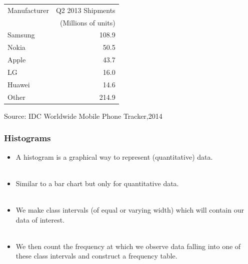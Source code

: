 \documentclass[xcolor=svgnames, compress]{beamer}
\begin{document}
\begin{frame}[t]
\tiny

\vspace{-5.50cm}
\begin{center}
\begin{tabular}{lr}
Manufacturer 	& Q2 2013 Shipments 	\\
			& (Millions of units)		\\
\hline
Samsung	&	108.9	\\
Nokia	&	50.5		\\
Apple	&	43.7		\\
LG		&	16.0		\\
Huawei	&	14.6		\\
Other	&	214.9	\\
\hline
\end{tabular}
\end{center}
\vspace{-0.35cm}
\hspace{3.4cm} \tiny{Source: IDC Worldwide Mobile Phone Tracker,2014}	






\end{frame}





\begin{frame}[t]
\frametitle{Histograms}

\begin{itemize}
\justifying
\item	A \alert{histogram} is a graphical way to represent (quantitative) data.\\
\hfill\\
\item	Similar to a bar chart but only for quantitative data.\\
\hfill\\
\item	We make \alert{class intervals} (of equal or varying width) which will contain our data of interest.\\
\hfill\\
\item	We then count the \alert{frequency} at which we observe data falling into one of these class intervals and construct a \alert{frequency table}.\\
\end{itemize}

\end{frame}
\end{document}
